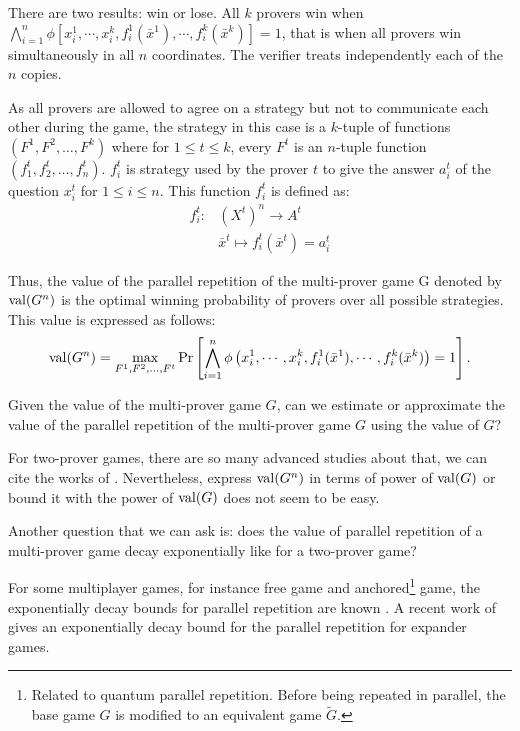 There are two results: win or lose. All $k$ provers win when $ \bigwedge\limits_{i=1}^n \phi [x_i^1, \cdots , x_i^k, f_i^1(\bar{x}^1), \cdots ,  f_i^k(\bar{x}^k)]=1$, that is when all provers win simultaneously in all $n$ coordinates. The verifier treats independently each of the $n$ copies. 

As  all provers are allowed to agree on a strategy but not to communicate each other during the game, the strategy in this case is a $k$-tuple of functions $(F^1,F^2, \ldots, F^k)$ where for $1\leq t \leq k$, every $F^t$ is an $n$-tuple function $(f_1^t, f_2^t, \ldots, f_n^t)$. $f_i^t$ is strategy used by the prover $t$ to give the answer $a_i^t$ of the question $x_i^t$ for $1\leq i \leq n$. This function $f_i^t$ is defined as:
\begin{align*}
f_i^t: & (X^t)^n \longrightarrow A^t \\ & \bar{x}^t \longmapsto f_i^t(\bar{x}^t)=a_i^t
\end{align*}

Thus, the value of the parallel repetition of the multi-prover game G denoted by $\mathrm{val}(G^n)$ is the optimal winning probability of provers over all possible strategies. This value is expressed as follows: 
$$ \mathrm{val} (G^n)= \max_{F^1,F^2, \ldots, F^t} \Pr \left[  \bigwedge\limits_{i=1}^n \phi \left( x_i^1, \cdots , x_i^k, f_i^1(\bar{x}^1), \cdots ,  f_i^k(\bar{x}^k) \right)=1 \right].$$


Given the value of the multi-prover game $G$, can we estimate or approximate the value of the parallel repetition of the multi-prover game $G$ using the value of $G$? 

For  two-prover games, there are so many advanced studies about that, we can cite the works of \cite*{feige1992two, verbitsky1996towards,raz1998parallel, holenstein2007parallel, barak2009strong,raz2010parallel, rao2011parallel,dinur2014analytical}.  Nevertheless, express $\mathrm{val} (G^n)$  in terms of power of $\mathrm{val} (G)$ or bound it with the power of $\mathrm{val} (G)$ does not seem to be easy.

 Another question that we can ask is: does the value of parallel repetition of a multi-prover game decay exponentially like for a two-prover game?

For some multiplayer games, for instance free game and anchored\footnote{ Related to quantum parallel repetition. Before being repeated in parallel, the base game $G$ is modified to an equivalent game $\tilde{G}$.} game, the exponentially decay bounds for parallel repetition are known \citep*{barak2009strong,bavarian2015anchoring}.  A recent work of \cite*{dinur2016multiplayer} gives an exponentially decay bound for the parallel repetition for  expander games. 

